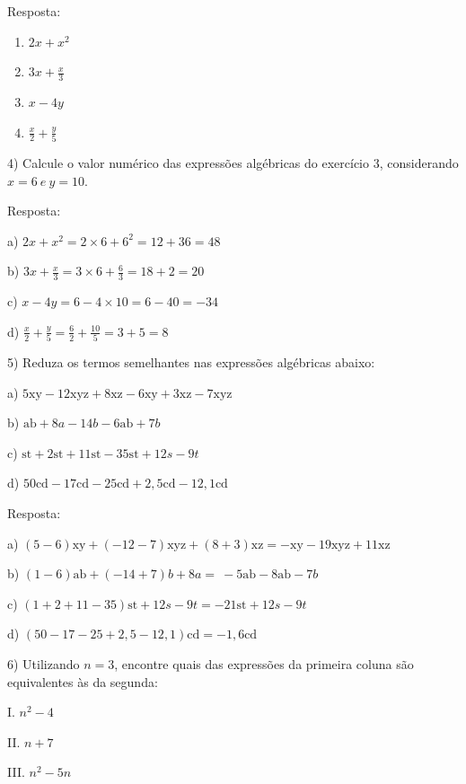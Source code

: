 Resposta:

\begin{enumerate}
\def\labelenumi{\alph{enumi})}
\item
  \(2x + x^2\)
\item
  \(3x + \frac{x}{3}\)
\item
  \(x - 4y\)
\item
  \(\frac{x}{2} + \frac{y}{5}\)
\end{enumerate}

4) Calcule o valor numérico das expressões algébricas do exercício 3,
considerando \(x = 6\ e\ y = 10.\)

Resposta:

a) \(2x + x^{2} = 2 \times 6 + 6^{2} = 12 + 36 = 48\)

b) \(3x + \frac{x}{3} = 3 \times 6 + \frac{6}{3} = 18 + 2 = 20\)

c) \(x - 4y = 6 - 4 \times 10 = 6 - 40 = - 34\)

d)
\(\frac{x}{2} + \frac{y}{5} = \frac{6}{2} + \frac{10}{5} = 3 + 5 = 8\)

5) Reduza os termos semelhantes nas expressões algébricas abaixo:

a)
\(5\text{xy} - 12\text{xyz} + 8\text{xz} - 6\text{xy} + 3\text{xz} - 7\text{xyz}\)

b) \(\text{ab} + 8a - 14b - 6\text{ab} + 7b\)

c) \(\text{st} + 2\text{st} + 11\text{st} - 35\text{st} + 12s - 9t\)

d)
\(50\text{cd} - 17\text{cd} - 25\text{cd} + 2,5\text{cd} - 12,1\text{cd}\)

Resposta:

a)
\(\left( 5 - 6 \right)\text{xy} + \left( - 12 - 7 \right)\text{xyz} + \left( 8 + 3 \right)\text{xz} = - \text{xy} - 19\text{xyz} + 11\text{xz}\)

b)
\(\left( 1 - 6 \right)\text{ab} + \left( - 14 + 7 \right)b + 8a = \  - 5\text{ab} - 8\text{ab} - 7b\)

c)
\(\left( 1 + 2 + 11 - 35 \right)\text{st} + 12s - 9t = - 21\text{st} + 12s - 9t\)

d)
\(\left( 50 - 17 - 25 + 2,5 - 12,1 \right)\text{cd} = - 1,6\text{cd}\)

6) Utilizando \(n = 3\), encontre quais das expressões da primeira
coluna são equivalentes às da segunda:

I. \(n^{2} - 4\)

II. \(n + 7\)

III. \(n^{2} - 5n\)


